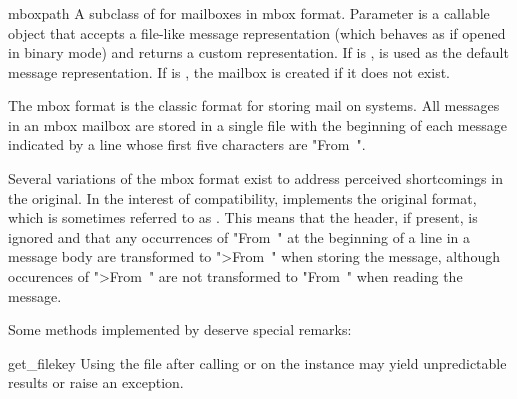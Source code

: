 \begin{seealso}
\end{seealso}

\subsubsection{}
\label{mailbox-mbox}

\begin{classdesc}{mbox}{path}
A subclass of  for mailboxes in mbox format. Parameter
 is a callable object that accepts a file-like message
representation (which behaves as if opened in binary mode) and returns a custom
representation. If  is ,  is used as
the default message representation. If  is , the mailbox
is created if it does not exist.
\end{classdesc}

The mbox format is the classic format for storing mail on \UNIX{} systems. All
messages in an mbox mailbox are stored in a single file with the beginning of
each message indicated by a line whose first five characters are "From~".

Several variations of the mbox format exist to address perceived shortcomings
in the original. In the interest of compatibility,  implements the
original format, which is sometimes referred to as . This means that
the  header, if present, is ignored and that any
occurrences of "From~" at the beginning of a line in a message body are
transformed to ">From~" when storing the message, although occurences of
">From~" are not transformed to "From~" when reading the message.

Some  methods implemented by  deserve special
remarks:

\begin{methoddesc}{get_file}{key}
Using the file after calling  or  on the
 instance may yield unpredictable results or raise an exception.
\end{methoddesc}

